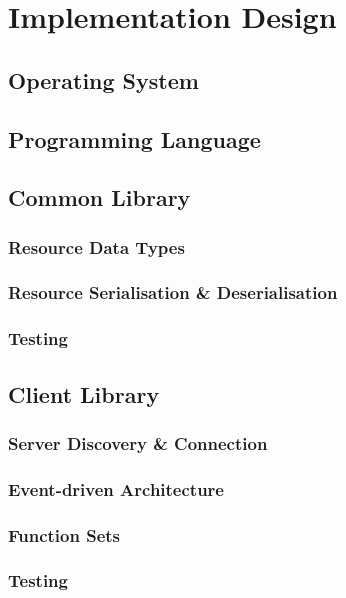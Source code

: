 \chapter{Implementation Design}\label{ch:implementation}


\section{Operating System}



\section{Programming Language}



\section{Common Library}


\subsection{Resource Data Types}

\subsection{Resource Serialisation \& Deserialisation}

\subsection{Testing}



\section{Client Library}

\subsection{Server Discovery \& Connection}

\subsection{Event-driven Architecture}

\subsection{Function Sets}

\subsection{Testing}









